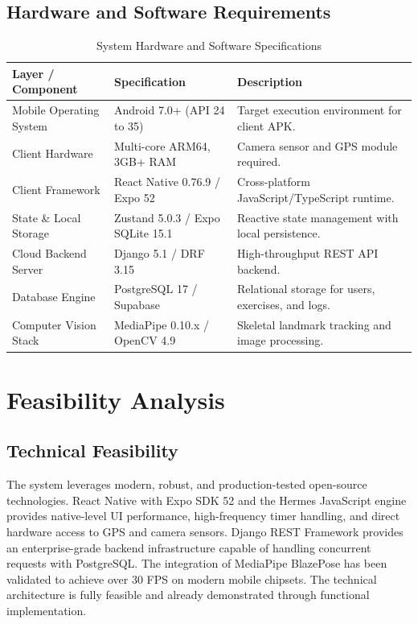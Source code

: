 \documentclass[12pt,a4paper]{report}
\begin{document}
\subsection{Hardware and Software Requirements}
\begin{table}[htbp]
\centering
\small
\renewcommand{\arraystretch}{1.25}
\begin{tabularx}{\textwidth}{|l|l|X|}
\hline
\textbf{Layer / Component} & \textbf{Specification} & \textbf{Description} \\
\hline
Mobile Operating System & Android 7.0+ (API 24 to 35) & Target execution environment for client APK. \\
\hline
Client Hardware & Multi-core ARM64, 3GB+ RAM & Camera sensor and GPS module required. \\
\hline
Client Framework & React Native 0.76.9 / Expo 52 & Cross-platform JavaScript/TypeScript runtime. \\
\hline
State \& Local Storage & Zustand 5.0.3 / Expo SQLite 15.1 & Reactive state management with local persistence. \\
\hline
Cloud Backend Server & Django 5.1 / DRF 3.15 & High-throughput REST API backend. \\
\hline
Database Engine & PostgreSQL 17 / Supabase & Relational storage for users, exercises, and logs. \\
\hline
Computer Vision Stack & MediaPipe 0.10.x / OpenCV 4.9 & Skeletal landmark tracking and image processing. \\
\hline
\end{tabularx}
\caption{System Hardware and Software Specifications}
\label{tab:hw_sw_specs}
\end{table}

\section{Feasibility Analysis}

\subsection{Technical Feasibility}
The system leverages modern, robust, and production-tested open-source technologies. React Native with Expo SDK 52 and the Hermes JavaScript engine provides native-level UI performance, high-frequency timer handling, and direct hardware access to GPS and camera sensors. Django REST Framework provides an enterprise-grade backend infrastructure capable of handling concurrent requests with PostgreSQL. The integration of MediaPipe BlazePose has been validated to achieve over 30 FPS on modern mobile chipsets. The technical architecture is fully feasible and already demonstrated through functional implementation.
\end{document}

